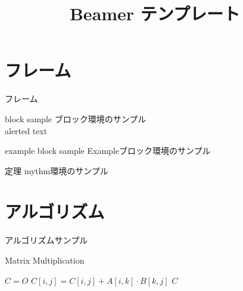 \documentclass[14pt,xcolor=dvipsnames,table,dvipdfmx,professional font]{beamer}
\title{Beamer テンプレート}
\author{}
\date{}
\institute{研究室}
\theoremstyle{definition}
\newenvironment{mythm}{\begin{alertblock}{定理}}{\end{alertblock}} %
\begin{document}
\maketitle
\frame{\tableofcontents[hideallsubsections]}
\section{フレーム}
\begin{frame}{フレーム}
    \begin{block}{block sample}
        ブロック環境のサンプル\\
        \alert{alerted text}
    \end{block} 
    \vfill
    \begin{exampleblock}{example block sample}
        Exampleブロック環境のサンプル
    \end{exampleblock} 
    \vfill
    \begin{mythm}
        mythm環境のサンプル
    \end{mythm} 
\end{frame}

\section{アルゴリズム}
\begin{frame}{アルゴリズムサンプル}
    \begin{block}{Matrix Multiplication}
        \begin{algorithmic}[1]
            \STATE $C = O$
            \STATE $C[i,j] = C[i,j] + A[i, k] \cdot B[k, j]$
            \ENDFOR
            \ENDFOR
            \ENDFOR
            \RETURN $C$
        \end{algorithmic}
    \end{block}
\end{frame}
\end{document}
